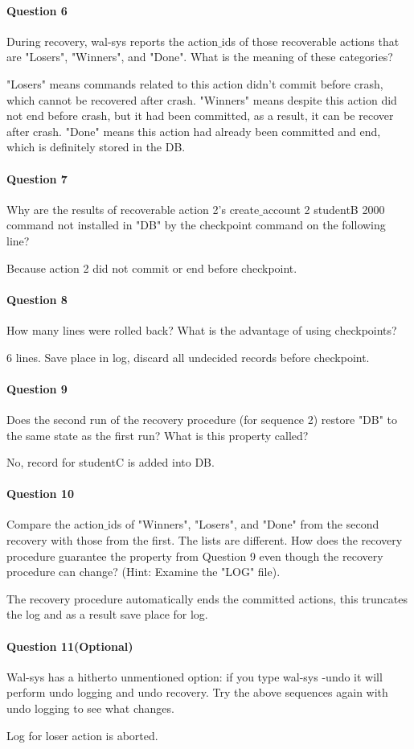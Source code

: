 \documentclass{article}
\begin{document}
\paragraph{Question 6} During recovery, wal-sys reports the action$\_$ids of those recoverable actions that are "Losers", "Winners", and "Done". What is the meaning of these categories?

"Losers" means commands related to this action didn't commit before crash, which cannot be recovered after crash. "Winners" means despite this action did not end before crash, but it had been committed, as a result, it can be recover after crash. "Done" means this action had already been committed and end, which is definitely stored in the DB.

\paragraph{Question 7} Why are the results of recoverable action 2's create$\_$account 2 studentB 2000 command not installed in "DB" by the checkpoint command on the following line?

Because action 2 did not commit or end before checkpoint.
\paragraph{Question 8} How many lines were rolled back? What is the advantage of using checkpoints?

6 lines. Save place in log, discard all undecided records before checkpoint.
\paragraph{Question 9} Does the second run of the recovery procedure (for sequence 2) restore "DB" to the same state as the first run? What is this property called?

No, record for studentC is added into DB.
\paragraph{Question 10} Compare the action$\_$ids of "Winners", "Losers", and "Done" from the second recovery with those from the first. The lists are different. How does the recovery procedure guarantee the property from Question 9 even though the recovery procedure can change? (Hint: Examine the "LOG" file).

The recovery procedure automatically ends the committed actions, this truncates the log and as a result save place for log.
\paragraph{Question 11(Optional)} Wal-sys has a hitherto unmentioned option: if you type wal-sys -undo it will perform undo logging and undo recovery. Try the above sequences again with undo logging to see what changes.

Log for loser action is aborted.
\end{document}
